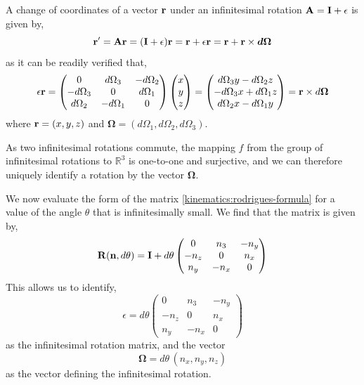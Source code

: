 \documentclass[12pt]{article}
\begin{document}
A change of coordinates of a vector $\vb{r}$ under an infinitesimal rotation
$\vb{A} = \vb{I} + \epsilon$ is given by,
\begin{equation}
  \vb{r}' = \vb{A}\vb{r} = (\vb{I} + \epsilon)\vb{r} = \vb{r} + \epsilon\vb{r}
           = \vb{r} + \vb{r} \times \boldsymbol{d\Omega}
\end{equation}
as it can be readily verified that,
\begin{equation}
  \epsilon\vb{r} =
  \begin{pmatrix}
    0           &  d\Omega_3 & -d\Omega_2 \\
    -d\Omega_3  &  0         &  d\Omega_1 \\
    d\Omega_2   & -d\Omega_1 &  0
  \end{pmatrix}
  \begin{pmatrix} x \\ y \\ z \end{pmatrix}
  =
  \begin{pmatrix}
    d\Omega_3 y - d\Omega_2 z \\
    -d\Omega_3 x + d\Omega_1 z \\
    d\Omega_2 x - d\Omega_1 y
  \end{pmatrix}
  = \vb{r} \times d\boldsymbol{\Omega}
\end{equation}
where $\vb{r} = (x,y,z)$ and $\boldsymbol{\Omega} = (d\Omega_1, d\Omega_2, d\Omega_3)$.

As two infinitesimal rotations commute, the mapping $f$ from the group of infinitesimal
rotations to $\mathbb{R}^3$ is one-to-one and surjective, and we can therefore uniquely
identify a rotation by the vector $\boldsymbol{\Omega}$.

We now evaluate the form of the matrix \eqref{kinematics:rodrigues-formula} for a value of the angle
$\theta$ that is infinitesimally small. We find that the matrix is given by,
\begin{equation}
  \vb{R}(\vb{n}, d\theta) = \vb{I} + d\theta
  \begin{pmatrix}
    0     &  n_3  & -n_y \\
    -n_z  &  0    &  n_x \\
    n_y   & -n_x  &  0
  \end{pmatrix}
\end{equation}
This allows us to identify,
\begin{equation}
  \epsilon = d\theta
  \begin{pmatrix}
    0     &  n_3  & -n_y \\
    -n_z  &  0    &  n_x \\
    n_y   & -n_x  &  0
  \end{pmatrix}
\end{equation}
as the infinitesimal rotation matrix, and the vector
\begin{equation}
  \boldsymbol{\Omega} = d\theta\,(n_x, n_y, n_z)
\end{equation}
as the vector defining the infinitesimal rotation.
\end{document}
